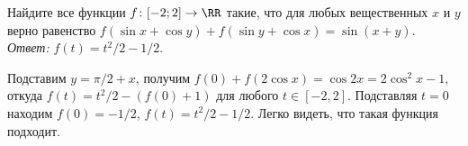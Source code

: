 \problem{}
Найдите все функции $f \colon [-2; 2] \to \RR$ такие, что для любых
вещественных $x$ и $y$ верно равенство
$f(\sin x + \cos y) + f(\sin y + \cos x) = \sin(x + y)$.
\solution
\emph{Ответ:} $f(t) = t^2 / 2 - 1/2$.
\par
Подставим $y = \pi / 2 + x$, получим
$f(0) + f(2 \cos x) = \cos 2 x = 2 \cos^2 x - 1$,
откуда $f(t) = t^2 / 2 - (f(0) + 1)$ для любого $t \in [-2,2]$.
Подставляя $t = 0$ находим $f(0) = -1 / 2$, $f(t) = t^2 / 2 - 1/2$.
Легко видеть, что такая функция подходит.
\endproblem
